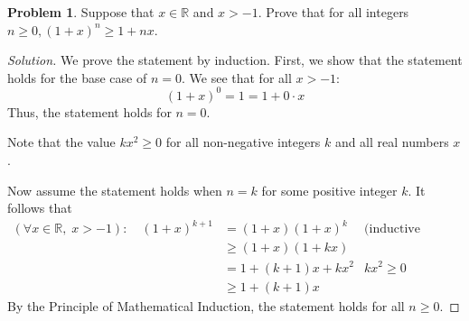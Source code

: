 \documentclass[12pt]{article}
\theoremstyle{definition}
\newtheorem{problem-internal}{Problem}[]
\newenvironment{problem}{
  \medskip
  \begin{problem-internal}
}{
\end{problem-internal}
}
\newenvironment{solution}{
  \begin{proof}[Solution]
    \vspace{-8px}
    \setlength{\parskip}{4px}
    \setlength{\parindent}{0px}
}{
\end{proof}
}
\begin{document}
  \begin{problem}
    Suppose that $x \in \mathbb{R}$ and $x > -1$. Prove that for all integers $n \geq 0, (1+x)^{n} \geq 1 + nx$.
  \end{problem}

  \begin{solution}
    We prove the statement by induction. First, we show that the statement holds for the base case of $n=0$. We see that for all $x > -1$:
    \[ (1+x)^{0} = 1 = 1 + 0 \cdot x \]
    Thus, the statement holds for $n=0$.

    Note that the value $kx^{2} \geq 0$ for all non-negative integers $k$ and all real numbers $x$.

    Now assume the statement holds when $n=k$ for some positive integer $k$. It follows that
    \begin{align*}
          (\forall x \in \mathbb{R},\; x > -1): \quad (1+x)^{k+1} & = (1+x) (1+x)^{k} &\text{(inductive hypothesis)}\\
          & \geq (1+x)(1+kx) \\
          & = 1 + (k+1)x + kx^{2} &\text{\(kx^2 \geq 0\)}\\
          & \geq 1 + (k+1)x
    \end{align*}
    By the Principle of Mathematical Induction, the statement holds for all $n \geq 0$.
  \end{solution}
\end{document}

